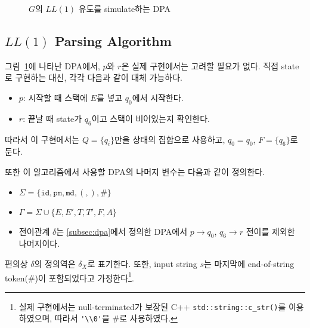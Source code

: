 \documentclass[a4paper,10pt]{scrartcl}
\numberwithin{equation}{section}
\numberwithin{figure}{section}
\numberwithin{table}{section}
\theoremstyle{definition}
\newenvironment{tikzautomata}
{%
  \begin{center}
    \begin{tikzpicture}[
      on grid,auto,thick,>={Stealth[round]},initial text=,
      every state/.style={inner sep=0pt, minimum size=0.75cm, node distance=1.75cm and 2.5cm, font=\normalsize},
      accepting/.style={double distance=2pt,outer sep=1pt},
      proc/.style={circle,draw},
      rloop/.style={in=330,out=30,looseness=5},
      lloop/.style={in=210,out=150,looseness=5},
      ]
  }{%
    \end{tikzpicture}
  \end{center}
}
\begin{document}
\begin{figure}[H]
  \caption{$G$의 $LL(1)$ 유도를 simulate하는 DPA} \label{fig:dpa}
\end{figure}

\subsection{$LL(1)$ Parsing Algorithm}
\label{subsec:ll1}

그림~\ref{fig:dpa}에 나타난 DPA에서, $p$와 $r$은 실제 구현에서는 고려할 필요가 없다. 직접 state로 구현하는 대신, 각각 다음과 같이 대체 가능하다.
\begin{itemize}
  \item $p$: 시작할 때 스택에 $E$를 넣고 $q_0$에서 시작한다.
  \item $r$: 끝날 때 state가 $q_6$이고 스택이 비어있는지 확인한다.
\end{itemize}
따라서 이 구현에서는 $Q = \{q_i\}$만을 상태의 집합으로 사용하고, $q_0 = q_0$, $F = \{q_6\}$로 둔다.

또한 이 알고리즘에서 사용할 DPA의 나머지 변수는 다음과 같이 정의한다.
\begin{itemize}
  \item $\Sigma = \{\texttt{id}, \texttt{pm}, \texttt{md}, (, ), \#\}$
  \item $\Gamma = \Sigma \cup \{E, E', T, T', F, A\}$
  \item 전이관계 $\delta$는 \ref{subsec:dpa}에서 정의한 DPA에서 $p \to q_0$, $q_6 \to r$ 전이를 제외한 나머지이다.
\end{itemize}
편의상 $\delta$의 정의역은 $\delta_X$로 표기한다. 또한, input string $s$는 마지막에 end-of-string token($\#$)이 포함되었다고 가정한다\footnote{실제 구현에서는 null-terminated가 보장된 C++ \lstinline{std::string::c_str()}를 이용하였으며, 따라서 \lstinline{'\\0'}을 $\#$로 사용하였다.}.
\end{document}
